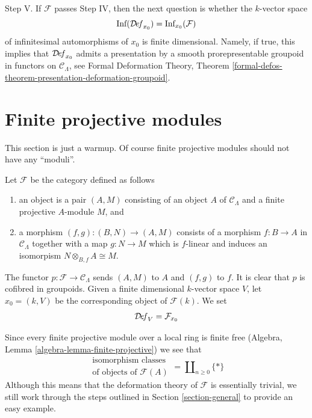 \medskip\noindent
Step V. If $\mathcal{F}$ passes Step IV, then the next question is whether
the $k$-vector space
$$
\text{Inf}(\mathcal{D}\!\mathit{ef}_{x_0}) = \text{Inf}_{x_0}(\mathcal{F})
$$
of infinitesimal automorphisms of $x_0$ is finite dimensional.
Namely, if true, this implies that
$\mathcal{D}\!\mathit{ef}_{x_0}$ admits a presentation by a
smooth prorepresentable groupoid in functors on $\mathcal{C}_\Lambda$, see
Formal Deformation Theory, Theorem
\ref{formal-defos-theorem-presentation-deformation-groupoid}.




\section{Finite projective modules}
\label{section-finite-projective-modules}

\noindent
This section is just a warmup. Of course finite projective modules
should not have any ``moduli''.

\begin{example}
\label{example-finite-projective-modules}
Let $\mathcal{F}$ be the category defined as follows
\begin{enumerate}
\item an object is a pair $(A, M)$ consisting of an
object $A$ of $\mathcal{C}_\Lambda$ and a
finite projective $A$-module $M$, and
\item a morphism $(f, g) : (B, N) \to (A, M)$ consists of
a morphism $f : B \to A$ in $\mathcal{C}_\Lambda$ together
with a map $g : N \to M$ which is $f$-linear and induces
an isomorpism $N \otimes_{B, f} A \cong M$.
\end{enumerate}
The functor $p : \mathcal{F} \to \mathcal{C}_\Lambda$ sends $(A, M)$ to $A$
and $(f, g)$ to $f$. It is clear that $p$ is cofibred in groupoids.
Given a finite dimensional $k$-vector space $V$,
let $x_0 = (k, V)$ be the corresponding object of $\mathcal{F}(k)$.
We set
$$
\mathcal{D}\!\mathit{ef}_V = \mathcal{F}_{x_0}
$$
\end{example}

\noindent
Since every finite projective module over a local ring is finite free
(Algebra, Lemma \ref{algebra-lemma-finite-projective})
we see that
$$
\begin{matrix}
\text{isomorphism classes} \\
\text{of objects of }\mathcal{F}(A)
\end{matrix}
= \coprod\nolimits_{n \geq 0} \{*\}
$$
Although this means that the deformation theory of $\mathcal{F}$
is essentially trivial, we still work through the steps outlined
in Section \ref{section-general} to provide an easy example.

